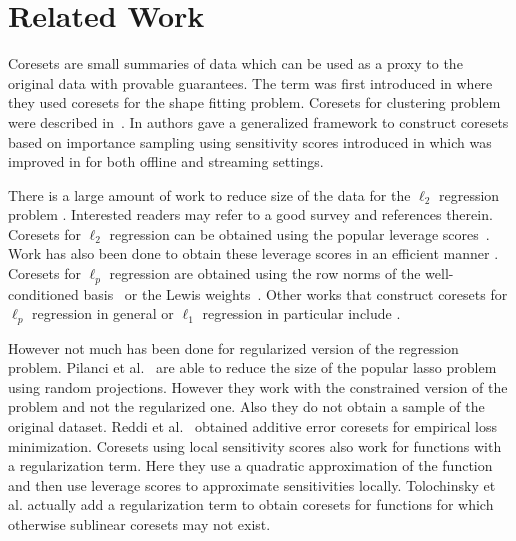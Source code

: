 \section{Related Work}
Coresets are small summaries of data which 
can be used as a proxy to the original data with provable guarantees. The term was first introduced in \cite{agarwal2004approximating} where they used coresets for the shape fitting problem. Coresets for clustering problem were described in~\cite{har2004coresets}. 
In \cite{feldman2011unified} authors gave a generalized framework to construct coresets based on importance sampling using sensitivity scores introduced in \cite{langberg2010universal} which was improved in \cite{braverman2016new} for both offline and streaming settings.

There is a large amount of work to reduce size of the data for the $\ell_2$ regression problem \cite{drineas2011faster,clarkson2017low}. Interested readers may refer to a good survey \cite{woodruff2014sketching} and references therein. Coresets for $\ell_2$ regression can be obtained using the popular leverage scores~\cite{drineas2006sampling}. Work has also been done to obtain these leverage scores in an efficient manner \cite{drineas2012fast}. Coresets for $\ell_p$ regression are obtained using the row norms of the well-conditioned basis~\cite{dasgupta2009sampling} or the Lewis weights~\cite{cohen2015p}. Other works that construct coresets for $\ell_p$ regression in general or $\ell_1$ regression in particular include \cite{sohler2011subspace,meng2013low,woodruff2013subspace,clarkson2016fast,dickens2018leveraging}. 

However not much has been done for regularized version of the regression problem. Pilanci et al.~\cite{pilanci2015randomized} are able to reduce the size of the popular lasso problem using random projections. However they work with the constrained version of the problem and not the regularized one. Also they do not obtain a sample of the original dataset. Reddi et al.~\cite{reddi2015communication} obtained additive error coresets for empirical loss minimization. Coresets using local sensitivity scores \cite{raj2019importance} also work for functions with a regularization term. Here they use a quadratic approximation of the function and then use leverage scores to approximate sensitivities locally. Tolochinsky et al. \cite{tolochinsky2018coresets} actually add a regularization term to obtain coresets for functions for which otherwise sublinear coresets may not exist.

